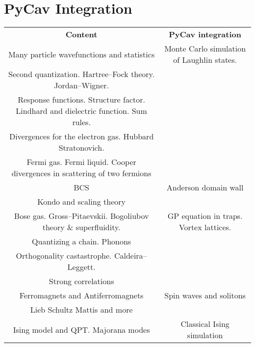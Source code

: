 \section{PyCav Integration}


\begin{table} 
    \begin{tabular}{ c | c }
     \textbf{Content}   & \textbf{PyCav integration}  \\ 
       Many particle wavefunctions and statistics 
   & Monte Carlo simulation of Laughlin states. \\ 
      Second quantization. Hartree--Fock theory. Jordan--Wigner.  &  \\ 
      Response functions. Structure factor. Lindhard and dielectric function. Sum rules.     &  \\ 
        Divergences for the electron gas. Hubbard Stratonovich. & \\
      Fermi gas. Fermi liquid. Cooper divergences in scattering of two fermions  &  \\ 
      BCS   & Anderson domain wall  \\ 
      Kondo and scaling theory   &  \\ 
      Bose gas. Gross--Pitaevskii. Bogoliubov theory \& superfluidity.   & GP equation in traps. Vortex lattices. \\ 
      Quantizing a chain. Phonons   &  \\ 
      Orthogonality castastrophe. Caldeira--Leggett.   &  \\ 
      Strong correlations   &  \\ 
      Ferromagnets and Antiferromagnets   & Spin waves and solitons \\ 
      Lieb Schultz Mattis and more \\
    Ising model and QPT. Majorana modes   &  Classical Ising simulation \\ 


    \end{tabular} 
\end{table}

